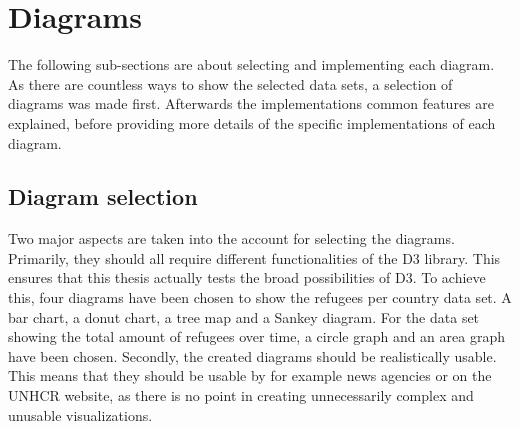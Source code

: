 




\section{Diagrams}

The following sub-sections are about selecting and implementing each diagram. As there are countless ways to show the selected data sets, a selection of diagrams was made first. Afterwards the implementations common features are explained, before providing more details of the specific implementations of each diagram.

\subsection{Diagram selection} \label{sec:diagram-selection}
Two major aspects are taken into the account for selecting the diagrams. Primarily, they should all require different functionalities of the D3 library. This ensures that this thesis actually tests the broad possibilities of D3. To achieve this, four diagrams have been chosen to show the refugees per country data set. A bar chart, a donut chart, a tree map and a Sankey diagram. For the data set showing the total amount of refugees over time, a circle graph and an area graph have been chosen.
Secondly, the created diagrams should be realistically usable. This means that they should be usable by for example news agencies or on the UNHCR website, as there is no point in creating unnecessarily complex and unusable visualizations.


